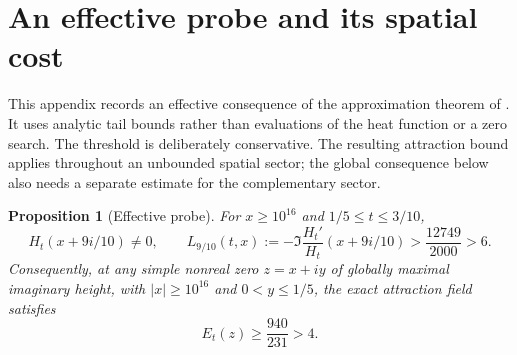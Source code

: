 \documentclass[11pt]{article}
\numberwithin{equation}{section}
\newtheorem{proposition}[theorem]{Proposition}
\theoremstyle{definition}
\theoremstyle{remark}
\begin{document}
\section{An effective probe and its spatial cost}\label{app:effective-probe}

This appendix records an effective consequence of the approximation theorem
of \cite[Theorem~1.3, equations (20)--(24)]{polymath}.  It uses analytic
tail bounds rather than evaluations of the heat function or a zero search.
The threshold is deliberately conservative.  The resulting attraction bound
applies throughout an unbounded spatial sector; the global consequence below
also needs a separate estimate for the complementary sector.

\begin{proposition}[Effective probe]\label{prop:effective-probe}
For \(x\ge 10^{16}\) and \(1/5\le t\le 3/10\),
\[
 H_t(x+9i/10)\ne0,\qquad
 L_{9/10}(t,x):=-\Im\frac{H_t'}{H_t}(x+9i/10)
 >\frac{12749}{2000}>6.
\]
Consequently, at any simple nonreal zero \(z=x+iy\) of globally maximal
imaginary height, with \(|x|\ge10^{16}\) and \(0<y\le1/5\), the exact
attraction field satisfies
\[
 E_t(z)\ge\frac{940}{231}>4.
\]
\end{proposition}
\end{document}
